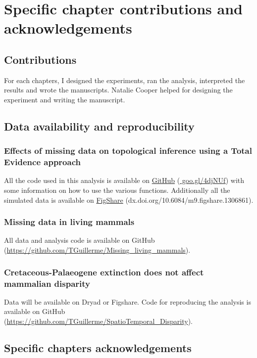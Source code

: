 \chapter*{Specific chapter contributions and acknowledgements}

\section*{Contributions}
For each chapters, I designed the experiments, ran the analysis, interpreted the results and wrote the manuscripts. Natalie Cooper helped for designing the experiment and writing the manuscript.

\section*{Data availability and reproducibility}
\subsection*{Effects of missing data on topological inference using a Total Evidence approach}
All the code used in this analysis is available on \href{https://github.com/TGuillerme/Total_Evidence_Method-Missing_data}{GitHub} (\href{https://github.com/TGuillerme/Total_Evidence_Method-Missing_data}{    
goo.gl/4djNUf}) with some information on how to use the various functions. Additionally all the simulated data is available on \href{http://figshare.com/articles/Effect_of_missing_data_on_topological_inference_using_a_total_evidence_approach/1306861}{FigShare} (dx.doi.org/10.6084/m9.figshare.1306861).

\subsection*{Missing data in living mammals}
All data and analysis code is available on GitHub (\url{https://github.com/TGuillerme/Missing_living_mammals}).

\subsection*{Cretaceous-Palaeogene extinction does not affect mammalian disparity}
Data will be available on Dryad or Figshare.
Code for reproducing the analysis is available on GitHub (\url{https://github.com/TGuillerme/SpatioTemporal_Disparity}).


\section*{Specific chapters acknowledgements}
